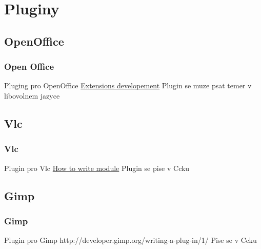 \documentclass[pdf]{beamer}
\begin{document}
\section{Pluginy}
\subsection{OpenOffice} %
\begin{frame} 
        \frametitle{Open Office}
	\begin{block}{}
		Pluging pro OpenOffice
		\href{https://wiki.openoffice.org/wiki/Extensions_development}{Extensions developement}
		Plugin se muze psat temer v libovolnem jazyce
	\end{block}
\end{frame}  %

\subsection{Vlc} %
	\begin{frame}
	\frametitle{Vlc}
	\begin{block}{}
		Plugin pro Vlc
		\href{https://wiki.videolan.org/Hacker_Guide/How_To_Write_a_Module/}{How to write module}
		Plugin se pise v Ccku
	\end{block}
\end{frame}%

\subsection{Gimp}%
	\begin{frame}
	\frametitle{Gimp}
	\begin{block}{}
			Plugin pro Gimp
			http://developer.gimp.org/writing-a-plug-in/1/
			Pise se v Ccku
		\end{block}
	\end{frame} %
\end{document}
